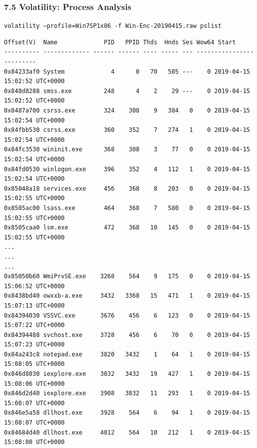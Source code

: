 \begin{frame}[fragile]
  \frametitle{7.5 Volatility: Process Analysis}
    \texttt{\footnotesize volatility --profile=Win7SP1x86 -f Win-Enc-20190415.raw pslist}
    \begin{lstlisting}[basicstyle=\tiny]
Offset(V)  Name             PID   PPID Thds  Hnds Ses Wow64 Start          
---------- ------------- ------ ------ ---- ----- --- -------------------------
0x84233af0 System             4      0   70   505 ---    0 2019-04-15 15:02:52 UTC+0000 
0x848d8288 smss.exe         248      4    2    29 ---    0 2019-04-15 15:02:52 UTC+0000
0x8487a700 csrss.exe        324    308    9   384   0    0 2019-04-15 15:02:54 UTC+0000
0x84fbb530 csrss.exe        360    352    7   274   1    0 2019-04-15 15:02:54 UTC+0000
0x84fc3530 wininit.exe      368    308    3    77   0    0 2019-04-15 15:02:54 UTC+0000
0x84fd0530 winlogon.exe     396    352    4   112   1    0 2019-04-15 15:02:54 UTC+0000
0x85048a18 services.exe     456    368    8   203   0    0 2019-04-15 15:02:55 UTC+0000
0x8505ac00 lsass.exe        464    368    7   580   0    0 2019-04-15 15:02:55 UTC+0000
0x8505caa0 lsm.exe          472    368   10   145   0    0 2019-04-15 15:02:55 UTC+0000
...
...
...
0x85050b60 WmiPrvSE.exe    3268    564    9   175   0    0 2019-04-15 15:06:52 UTC+0000
0x8438bd40 owxxb-a.exe     3432   3368   15   471   1    0 2019-04-15 15:07:13 UTC+0000
0x84394030 VSSVC.exe       3676    456    6   123   0    0 2019-04-15 15:07:22 UTC+0000
0x84394488 svchost.exe     3728    456    6    70   0    0 2019-04-15 15:07:23 UTC+0000
0x84a243c8 notepad.exe     3820   3432    1    64   1    0 2019-04-15 15:08:05 UTC+0000
0x846d8030 iexplore.exe    3832   3432   19   427   1    0 2019-04-15 15:08:06 UTC+0000
0x846d2d40 iexplore.exe    3908   3832   11   293   1    0 2019-04-15 15:08:07 UTC+0000
0x846e5a58 dllhost.exe     3928    564    6    94   1    0 2019-04-15 15:08:07 UTC+0000
0x84684d40 dllhost.exe     4012    564   10   212   1    0 2019-04-15 15:08:08 UTC+0000
    \end{lstlisting}
\end{frame}


